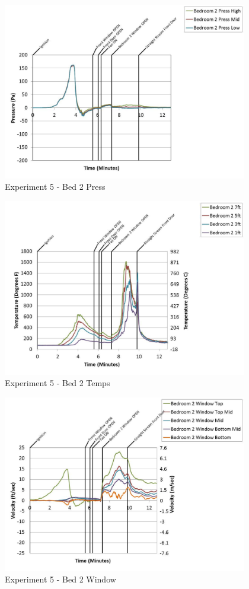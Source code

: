 \documentclass{article}
\begin{document}
\begin{appendices}
	\begin{figure}[h!]
		\centering
		\includegraphics[height=3.05in]{0_Images/Results_Charts/Exp_5_Charts/Bed2Press.pdf}
		\caption{Experiment 5 - Bed 2 Press}
	\end{figure}
 
	\clearpage

	\begin{figure}[h!]
		\centering
		\includegraphics[height=3.05in]{0_Images/Results_Charts/Exp_5_Charts/Bed2Temps.pdf}
		\caption{Experiment 5 - Bed 2 Temps}
	\end{figure}
 

	\begin{figure}[h!]
		\centering
		\includegraphics[height=3.05in]{0_Images/Results_Charts/Exp_5_Charts/Bed2Window.pdf}
		\caption{Experiment 5 - Bed 2 Window}
	\end{figure}
 

\end{appendices}
\end{document}
